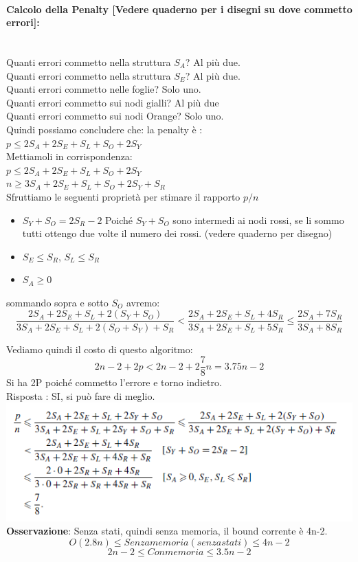\paragraph{Calcolo della Penalty [Vedere quaderno per i disegni su dove commetto
            errori]:}\ \\
Quanti errori commetto nella struttura $S_A$? Al più due.\\
Quanti errori commetto nella struttura $S_E$? Al più due.\\
Quanti errori commetto nelle foglie? Solo uno.\\
Quanti errori commetto sui nodi gialli? Al più due\\
Quanti errori commetto sui nodi Orange? Solo uno.\\
Quindi possiamo concludere che: la penalty è : \\
$p \leq 2 S_A + 2 S_E + S_L + S_O + 2 S_Y$\\
Mettiamoli in corrispondenza: \\
$p \leq 2 S_A + 2 S_E + S_L + S_O + 2 S_Y$\\
$n \geq 3 S_A + 2 S_E + S_L + S_O + 2 S_Y + S_R$\\

Sfruttiamo le seguenti proprietà per stimare il rapporto $p/n$
\begin{itemize}
    \item $S_Y + S_O = 2 S_R - 2$ Poiché $S_Y + S_O$ sono intermedi ai nodi rossi,
          se li sommo tutti ottengo due volte il numero dei rossi. (vedere quaderno per
          disegno)
    \item $S_E \leq S_R$, $S_L \leq S_R$
    \item $S_A \geq 0$
\end{itemize}
sommando sopra e sotto $S_O$ avremo: \\
$$\frac{2 S_A + 2 S_E + S_L + 2(S_Y + S_O)}{3 S_A + 2 S_E + S_L + 2(S_O + S_Y) +
        S_R} < \frac{2 S_A + 2 S_E + S_L + 4 S_R}{3 S_A + 2 S_E + S_L + 5 S_R} \leq
    \frac{2 S_A + 7 S_R}{3 S_A + 8 S_R} $$

Vediamo quindi il costo di questo algoritmo:\\
$$ 2n - 2 + 2p < 2n -2 + 2 \frac{7}{8} n = 3.75n -2 $$ Si ha 2P poiché commetto
l'errore e torno indietro.\\
Risposta : SI, si può fare di meglio.\\

\includegraphics[]{capitoli/esplorazione-grafo-anonimo/imgs/66.png}\\
\textbf{Osservazione}: Senza stati, quindi senza memoria, il bound corrente è
4n-2.\\
$$O(2.8n) \leq Senza memoria (senza stati) \leq 4n-2$$
$$2n-2 \leq Con memoria \leq 3.5n -2 $$

